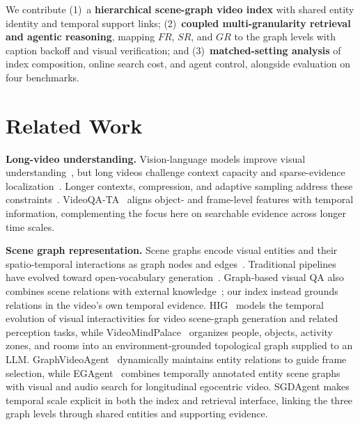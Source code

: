 \documentclass[11pt]{article}
\begin{document}
We contribute (1)~a \textbf{hierarchical scene-graph video index} with shared entity identity and temporal support links; (2)~\textbf{coupled multi-granularity retrieval and agentic reasoning}, mapping $FR$, $SR$, and $GR$ to the graph levels with caption backoff and visual verification; and (3)~\textbf{matched-setting analysis} of index composition, online search cost, and agent control, alongside evaluation on four benchmarks.

\section{Related Work}
\label{sec:related}

\textbf{Long-video understanding.}
Vision-language models improve visual understanding~\cite{radford2021CLIP,li2022GLIP,llava2023,video-llava2024,bai2025qwen3vl}, but long videos challenge context capacity and sparse-evidence localization~\cite{caba2015activitynet,lvbench,longvideobench2024}.
Longer contexts, compression, and adaptive sampling address these constraints~\cite{gemini15,qwen,internvl,seed,longvu2025,shu2025video,apollo2025,wang2025adaretake}.
VideoQA-TA~\cite{wu2025videoqata} aligns object- and frame-level features with temporal information, complementing the focus here on searchable evidence across longer time scales.

\textbf{Scene graph representation.}
Scene graphs encode visual entities and their spatio-temporal interactions as graph nodes and edges~\cite{xu2017scene}.
Traditional pipelines~\cite{xu2017scene,motifs2018} have evolved toward open-vocabulary generation~\cite{frompixel2024,vs32023,hyperglm2025}.
Graph-based visual QA also combines scene relations with external knowledge~\cite{ziaeefard2020knowledge}; our index instead grounds relations in the video's own temporal evidence.
HIG~\cite{hig2024} models the temporal evolution of visual interactivities for video scene-graph generation and related perception tasks, while VideoMindPalace~\cite{videomindpalace2025} organizes people, objects, activity zones, and rooms into an environment-grounded topological graph supplied to an LLM.
GraphVideoAgent~\cite{graphvideoagent2025} dynamically maintains entity relations to guide frame selection, while EGAgent~\cite{egagent2026} combines temporally annotated entity scene graphs with visual and audio search for longitudinal egocentric video.
SGDAgent makes temporal scale explicit in both the index and retrieval interface, linking the three graph levels through shared entities and supporting evidence.
\end{document}

